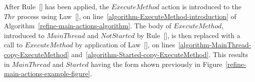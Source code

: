 After Rule~[] has been applied, the
$ExecuteMethod$ action is introduced to the $Thr$ process using
Law~[], on
line~\ref{algorithm-ExecuteMethod-introduction} of
Algorithm~\ref{refine-main-actions-algorithm}.
The body of $ExecuteMethod$, introduced to $MainThread$ and
$NotStarted$ by Rule~[], is then
replaced with a call to $ExecuteMethod$ by application of
Law~[], on
lines~\ref{algorithm-MainThread-copy-ExecuteMethod}
and~\ref{algorithm-Started-copy-ExecuteMethod}.
This results in $MainThread$ and $Started$ having the form shown
previously in Figure~\ref{refine-main-actions-example-figure}.
